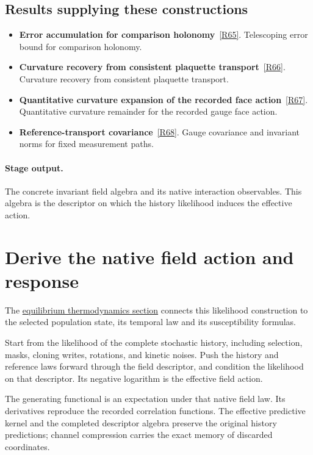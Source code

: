\documentclass[11pt,a4paper]{article}
\begin{document}
\subsection*{Results supplying these constructions}
\begin{itemize}
\item \textbf{Error accumulation for comparison holonomy}~\hyperref[src:lem-regge-holonomy-approx]{[R65]}. Telescoping error bound for comparison holonomy.
\item \textbf{Curvature recovery from consistent plaquette transport}~\hyperref[src:thm-riemann-scutoid]{[R66]}. Curvature recovery from consistent plaquette transport.
\item \textbf{Quantitative curvature expansion of the recorded face action}~\hyperref[src:lem-ym-recorded-face-action-remainder]{[R67]}. Quantitative curvature remainder for the recorded gauge face action.
\item \textbf{Reference-transport covariance}~\hyperref[src:lem-reference-transport-covariance]{[R68]}. Gauge covariance and invariant norms for fixed measurement paths.
\end{itemize}
\paragraph{Stage output.} The concrete invariant field algebra and its native interaction observables. This algebra is the descriptor on which the history likelihood induces the effective action.

\section{Derive the native field action and response}
\label{stage:12}
The \hyperref[sec:equilibrium-thermodynamics]{equilibrium thermodynamics section} connects this likelihood construction to the selected population state, its temporal law and its susceptibility formulas.

Start from the likelihood of the complete stochastic history, including selection, masks, cloning writes, rotations, and kinetic noises. Push the history and reference laws forward through the field descriptor, and condition the likelihood on that descriptor. Its negative logarithm is the effective field action.

The generating functional is an expectation under that native field law. Its derivatives reproduce the recorded correlation functions. The effective predictive kernel and the completed descriptor algebra preserve the original history predictions; channel compression carries the exact memory of discarded coordinates.
\end{document}
